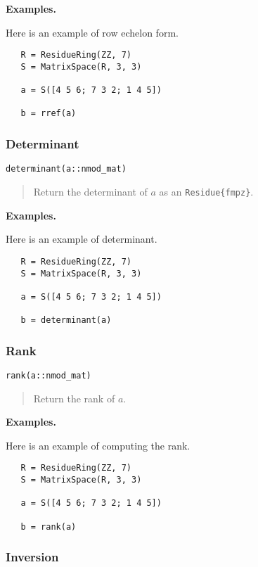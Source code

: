 \documentclass[a4paper,10pt]{article}
\newcommand{\code}{\lstinline}
\newcommand{\desc}[1]{\vspace{-3mm}\begin{quote}#1\end{quote}}
\begin{document}
{{\textbf{Examples.}

Here is an example of row echelon form.

\begin{lstlisting}
   R = ResidueRing(ZZ, 7)
   S = MatrixSpace(R, 3, 3)

   a = S([4 5 6; 7 3 2; 1 4 5])

   b = rref(a)
\end{lstlisting}

\subsubsection{Determinant}

\begin{lstlisting}
determinant(a::nmod_mat)
\end{lstlisting}

\desc{Return the determinant of $a$ as an \code|Residue{fmpz}|.}

\textbf{Examples.}

Here is an example of determinant.

\begin{lstlisting}
   R = ResidueRing(ZZ, 7)
   S = MatrixSpace(R, 3, 3)

   a = S([4 5 6; 7 3 2; 1 4 5])

   b = determinant(a)
\end{lstlisting}

\subsubsection{Rank}

\begin{lstlisting}
rank(a::nmod_mat)
\end{lstlisting}

\desc{Return the rank of $a$.}

\textbf{Examples.}

Here is an example of computing the rank.

\begin{lstlisting}
   R = ResidueRing(ZZ, 7)
   S = MatrixSpace(R, 3, 3)

   a = S([4 5 6; 7 3 2; 1 4 5])

   b = rank(a)
\end{lstlisting}

\subsubsection{Inversion}

}}
\end{document}
